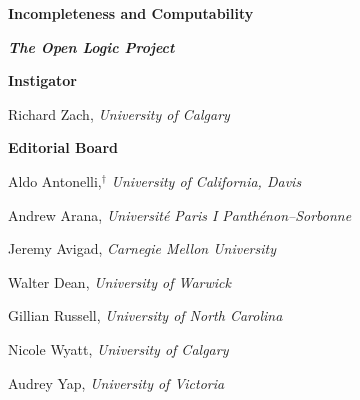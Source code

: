 %

\preto{}

\problemsperchapter
\allowdisplaybreaks

\frontmatter


\pagestyle{empty}

\vspace*{100pt}

\begin{raggedleft}

{\fontsize{24pt}{24pt}\selectfont\bfseries\sffamily%
Incompleteness and
Computability}

\end{raggedleft}


\newpage


\vspace*{100pt}

{\bfseries\itshape The Open Logic Project}

\bigskip

\textbf{\color{leadbeater}Instigator}

\medskip

Richard Zach, \emph{University of Calgary}

\bigskip

\textbf{\color{leadbeater}Editorial Board}

\medskip

Aldo Antonelli,$^\dagger$ \emph{University of California, Davis}

Andrew Arana, \emph{Universit\'e Paris I Panth\'enon--Sorbonne}

Jeremy Avigad, \emph{Carnegie Mellon University}

Walter Dean, \emph{University of Warwick}

Gillian Russell, \emph{University of North Carolina}

Nicole Wyatt, \emph{University of Calgary}

Audrey Yap, \emph{University of Victoria}

\bigskip

